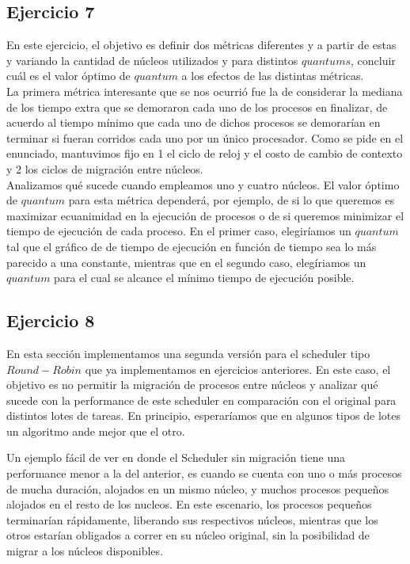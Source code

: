 \documentclass[11pt, a4paper, twoside]{article}
\begin{document}
\clearpage
\subsection{Ejercicio 7}
En este ejercicio, el objetivo es definir dos m\'etricas diferentes y a partir de estas y variando la
cantidad de n\'ucleos utilizados y para distintos $quantums$,  concluir cu\'al es el valor \'optimo de 
$quantum$ a los efectos de las distintas m\'etricas. \\
La primera m\'etrica interesante que se nos ocurri\'o fue la de considerar la mediana de los tiempo extra
que se demoraron cada uno de los procesos en finalizar, de acuerdo al tiempo m\'inimo que cada uno de dichos 
procesos se demorar\'ian en terminar si fueran corridos cada uno por un \'unico procesador. Como se pide en
el enunciado, mantuvimos fijo en 1 el ciclo de reloj y el costo de cambio de contexto y 2 los ciclos de 
migraci\'on entre n\'ucleos. \\
Analizamos qu\'e sucede cuando empleamos uno y cuatro n\'ucleos. El valor 
\'optimo de $quantum$ para esta m\'etrica depender\'a, por ejemplo, de si lo que queremos es maximizar 
ecuanimidad en la ejecuci\'on de procesos o de si queremos minimizar el tiempo de ejecuci\'on de cada
proceso. En el primer caso, elegir\'iamos un $quantum$ tal que el gr\'afico de de tiempo de ejecuci\'on
en funci\'on de tiempo sea lo m\'as parecido a una constante, mientras que en el segundo caso, eleg\'iriamos
un $quantum$ para el cual se alcance el m\'inimo tiempo de ejecuci\'on posible. \\





\clearpage
\subsection{Ejercicio 8}
En esta sección implementamos una segunda versión para el scheduler tipo $Round-Robin$ que ya implementamos
en ejercicios anteriores. En este caso, el objetivo es no permitir la migración de procesos entre núcleos y
analizar qué sucede con la performance de este scheduler en comparación con el original para distintos lotes
de tareas. En principio, esperaríamos que en algunos tipos de lotes un algoritmo ande mejor que el otro.

Un ejemplo fácil de ver en donde el Scheduler sin migración tiene una performance menor a la del anterior,
es cuando se cuenta con uno o más procesos de mucha duración, alojados en un mismo núcleo, y muchos procesos
pequeños alojados en el resto de los nucleos. En este escenario, los procesos pequeños terminarían rápidamente,
liberando sus respectivos núcleos, mientras que los otros estarían obligados a correr en su núcleo original, 
sin la posibilidad de migrar a los núcleos disponibles. 
\end{document}
